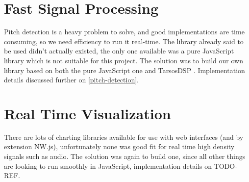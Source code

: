 \section{Fast Signal Processing}
Pitch detection is a heavy problem to solve, and good implementations are time
consuming, so we need efficiency to run it real-time. The library already said
to be used didn't actually existed, the only one available was a pure JavaScript
library \cite{pitchfinder} which is not suitable for this project. The solution
was to build our own library based on both the pure JavaScript one and TarsosDSP
\cite{TarsosDSP}. Implementation details discussed further on \autoref{pitch-detection}.

\section{Real Time Visualization}
There are lots of charting libraries available for use with web interfaces (and
by extension NW.js), unfortunately none was good fit for real time high density
signals such as audio. The solution was again to build one, since all other things
are looking to run smoothly in JavaScript, implementation details on TODO-REF.
